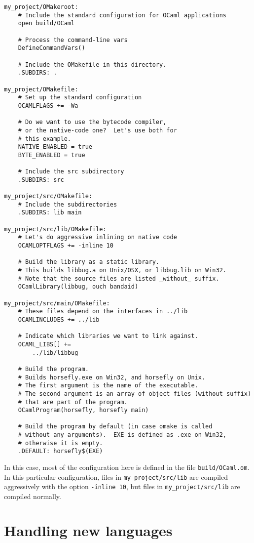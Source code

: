 \begin{verbatim}
my_project/OMakeroot:
    # Include the standard configuration for OCaml applications
    open build/OCaml
    
    # Process the command-line vars
    DefineCommandVars()
    
    # Include the OMakefile in this directory.
    .SUBDIRS: .

my_project/OMakefile:
    # Set up the standard configuration
    OCAMLFLAGS += -Wa

    # Do we want to use the bytecode compiler,
    # or the native-code one?  Let's use both for
    # this example.
    NATIVE_ENABLED = true
    BYTE_ENABLED = true

    # Include the src subdirectory
    .SUBDIRS: src

my_project/src/OMakefile:
    # Include the subdirectories
    .SUBDIRS: lib main

my_project/src/lib/OMakefile:
    # Let's do aggressive inlining on native code
    OCAMLOPTFLAGS += -inline 10

    # Build the library as a static library.
    # This builds libbug.a on Unix/OSX, or libbug.lib on Win32.
    # Note that the source files are listed _without_ suffix.
    OCamlLibrary(libbug, ouch bandaid)

my_project/src/main/OMakefile:
    # These files depend on the interfaces in ../lib
    OCAMLINCLUDES += ../lib

    # Indicate which libraries we want to link against.
    OCAML_LIBS[] +=
        ../lib/libbug

    # Build the program.
    # Builds horsefly.exe on Win32, and horsefly on Unix.
    # The first argument is the name of the executable.
    # The second argument is an array of object files (without suffix)
    # that are part of the program.
    OCamlProgram(horsefly, horsefly main)

    # Build the program by default (in case omake is called
    # without any arguments).  EXE is defined as .exe on Win32,
    # otherwise it is empty.
    .DEFAULT: horsefly$(EXE)
\end{verbatim}

In this case, most of the configuration here is defined in the file \verb+build/OCaml.om+.  In this
particular configuration, files in \verb+my_project/src/lib+ are compiled aggressively with the
option \verb+-inline 10+, but files in \verb+my_project/src/lib+ are compiled normally.

\section{Handling new languages}

